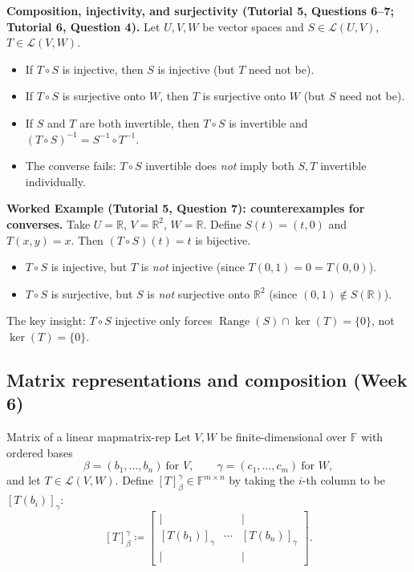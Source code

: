 \begin{keyformula}
\textbf{Composition, injectivity, and surjectivity (Tutorial 5, Questions 6--7; Tutorial 6, Question 4).}
Let $U,V,W$ be vector spaces and $S\in\mathcal{L}(U,V)$, $T\in\mathcal{L}(V,W)$.
\begin{itemize}
\item If $T\circ S$ is injective, then $S$ is injective (but $T$ need not be).
\item If $T\circ S$ is surjective onto $W$, then $T$ is surjective onto $W$ (but $S$ need not be).
\item If $S$ and $T$ are both invertible, then $T\circ S$ is invertible and $(T\circ S)^{-1}=S^{-1}\circ T^{-1}$.
\item The converse fails: $T\circ S$ invertible does \emph{not} imply both $S,T$ invertible individually.
\end{itemize}
\end{keyformula}

\begin{examplebox}
\textbf{Worked Example (Tutorial 5, Question 7): counterexamples for converses.}
Take $U=\mathbb{R}$, $V=\mathbb{R}^2$, $W=\mathbb{R}$.
Define $S(t)=(t,0)$ and $T(x,y)=x$.
Then $(T\circ S)(t)=t$ is bijective.
\begin{itemize}
\item $T\circ S$ is injective, but $T$ is \emph{not} injective (since $T(0,1)=0=T(0,0)$).
\item $T\circ S$ is surjective, but $S$ is \emph{not} surjective onto $\mathbb{R}^2$ (since $(0,1)\notin S(\mathbb{R})$).
\end{itemize}
The key insight: $T\circ S$ injective only forces $\operatorname{Range}(S)\cap\ker(T)=\{0\}$, not $\ker(T)=\{0\}$.
\end{examplebox}


\subsection{Matrix representations and composition (Week 6)}

\begin{definition}{Matrix of a linear map}{matrix-rep}
Let $V,W$ be finite-dimensional over $\mathbb{F}$ with ordered bases
\[
\beta=(b_1,\dots,b_n)\ \text{for }V,\qquad \gamma=(c_1,\dots,c_m)\ \text{for }W,
\]
and let $T\in\mathcal{L}(V,W)$.
Define $[T]^{\gamma}_{\beta}\in \mathbb{F}^{m\times n}$ by taking the $i$-th column to be $[T(b_i)]_\gamma$:
\[
[T]^{\gamma}_{\beta}\coloneqq
\begin{bmatrix}
\big| &        & \big|\\
[T(b_1)]_\gamma & \cdots & [T(b_n)]_\gamma\\
\big| &        & \big|
\end{bmatrix}.
\]

\end{definition}

